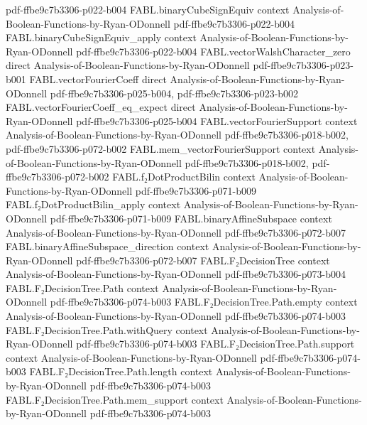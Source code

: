 \begin{theorem}
  {pdf-ffbe9c7b3306-p022-b004}
\proofstep
  {FABL.binaryCubeSignEquiv}
  {context}
  {Analysis-of-Boolean-Functions-by-Ryan-ODonnell}
  {pdf-ffbe9c7b3306-p022-b004}
\proofstep
  {FABL.binaryCubeSignEquiv_apply}
  {context}
  {Analysis-of-Boolean-Functions-by-Ryan-ODonnell}
  {pdf-ffbe9c7b3306-p022-b004}
\proofstep
  {FABL.vectorWalshCharacter_zero}
  {direct}
  {Analysis-of-Boolean-Functions-by-Ryan-ODonnell}
  {pdf-ffbe9c7b3306-p023-b001}
\proofstep
  {FABL.vectorFourierCoeff}
  {direct}
  {Analysis-of-Boolean-Functions-by-Ryan-ODonnell}
  {pdf-ffbe9c7b3306-p025-b004,
    pdf-ffbe9c7b3306-p023-b002}
\proofstep
  {FABL.vectorFourierCoeff_eq_expect}
  {direct}
  {Analysis-of-Boolean-Functions-by-Ryan-ODonnell}
  {pdf-ffbe9c7b3306-p025-b004}
\proofstep
  {FABL.vectorFourierSupport}
  {context}
  {Analysis-of-Boolean-Functions-by-Ryan-ODonnell}
  {pdf-ffbe9c7b3306-p018-b002,
    pdf-ffbe9c7b3306-p072-b002}
\proofstep
  {FABL.mem_vectorFourierSupport}
  {context}
  {Analysis-of-Boolean-Functions-by-Ryan-ODonnell}
  {pdf-ffbe9c7b3306-p018-b002,
    pdf-ffbe9c7b3306-p072-b002}
\proofstep
  {FABL.f₂DotProductBilin}
  {context}
  {Analysis-of-Boolean-Functions-by-Ryan-ODonnell}
  {pdf-ffbe9c7b3306-p071-b009}
\proofstep
  {FABL.f₂DotProductBilin_apply}
  {context}
  {Analysis-of-Boolean-Functions-by-Ryan-ODonnell}
  {pdf-ffbe9c7b3306-p071-b009}
\proofstep
  {FABL.binaryAffineSubspace}
  {context}
  {Analysis-of-Boolean-Functions-by-Ryan-ODonnell}
  {pdf-ffbe9c7b3306-p072-b007}
\proofstep
  {FABL.binaryAffineSubspace_direction}
  {context}
  {Analysis-of-Boolean-Functions-by-Ryan-ODonnell}
  {pdf-ffbe9c7b3306-p072-b007}
\proofstep
  {FABL.F₂DecisionTree}
  {context}
  {Analysis-of-Boolean-Functions-by-Ryan-ODonnell}
  {pdf-ffbe9c7b3306-p073-b004}
\proofstep
  {FABL.F₂DecisionTree.Path}
  {context}
  {Analysis-of-Boolean-Functions-by-Ryan-ODonnell}
  {pdf-ffbe9c7b3306-p074-b003}
\proofstep
  {FABL.F₂DecisionTree.Path.empty}
  {context}
  {Analysis-of-Boolean-Functions-by-Ryan-ODonnell}
  {pdf-ffbe9c7b3306-p074-b003}
\proofstep
  {FABL.F₂DecisionTree.Path.withQuery}
  {context}
  {Analysis-of-Boolean-Functions-by-Ryan-ODonnell}
  {pdf-ffbe9c7b3306-p074-b003}
\proofstep
  {FABL.F₂DecisionTree.Path.support}
  {context}
  {Analysis-of-Boolean-Functions-by-Ryan-ODonnell}
  {pdf-ffbe9c7b3306-p074-b003}
\proofstep
  {FABL.F₂DecisionTree.Path.length}
  {context}
  {Analysis-of-Boolean-Functions-by-Ryan-ODonnell}
  {pdf-ffbe9c7b3306-p074-b003}
\proofstep
  {FABL.F₂DecisionTree.Path.mem_support}
  {context}
  {Analysis-of-Boolean-Functions-by-Ryan-ODonnell}
  {pdf-ffbe9c7b3306-p074-b003}

\end{theorem}
